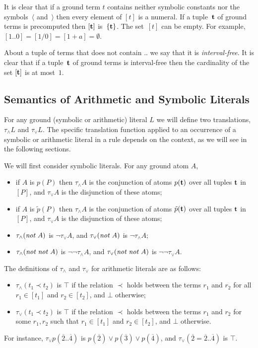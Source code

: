 \documentclass{tlp}
\def\no{{\it not}}
\begin{document}
It is clear that if a ground term $t$ contains neither symbolic
constants nor the symbols~$\langle$ and~$\rangle$ then every element of $[t]$
is a numeral.
If a tuple~${\bf t}$ of ground terms is
precomputed then $[{\bf t}]$ is~$\{{\bf t}\}$.
The set~$[t]$ can be empty. For example,
$[1..0] = [1/0] = [1+a] = \emptyset$.

About a tuple of terms that does not contain .. we say that it is
{\sl interval-free}.
It is clear that if a tuple~${\bf t}$ of
ground terms is interval-free then the cardinality of the set
$[{\bf t}]$ is at most~$1$.

\subsection{Semantics of Arithmetic and Symbolic Literals}

For any ground (symbolic or arithmetic) literal $L$ we will define
two translations,
$\tau_{\land}L$ and $\tau_{\lor}L$. The
specific translation function applied to an occurrence of a symbolic or
arithmetic literal in a rule
depends on the context, as we will see in the following sections.

We will first consider symbolic literals.
For any ground atom $A$,
\begin{itemize}
\item
if $A$ is $p(P)$ then $\tau_{\land}A$ is the conjunction of
atoms $p({\bf t})$ over all tuples $\bf t$ in~$[P]$,
and $\tau_{\lor}A$ is the disjunction of these atoms;
\item
if $A$ is $\tilde{p}(P)$ then $\tau_{\land}A$ is the conjunction of
atoms $\tilde{p}({\bf t})$ over all tuples $\bf t$ in~$[P]$,
and $\tau_{\lor}A$ is the disjunction of these atoms;
\item $\tau_{\land} (\no \; A)$ is $\neg \tau_{\lor} A$, and
 $\tau_{\lor} (\no \; A)$ is $\neg \tau_{\land} A$;
\item $\tau_{\land} (\no \; \no \; A)$ is
$\neg\neg \tau_{\land} A$, and
$\tau_{\lor} (\no \; \no \; A)$ is
$\neg\neg \tau_{\lor} A$.
\end{itemize}
The definitions of  $\tau_{\land}$ and $\tau_{\lor}$ for arithmetic literals
 are as follows:
\begin{itemize}
\item $\tau_{\land} (t_1 \prec t_2)$ is
$\top$ if the relation $\prec$ holds between
the terms $r_1$ and $r_2$ for all $r_1 \in
[t_1]$ and $r_2 \in [t_2]$, and $\bot$
otherwise;
\item $\tau_{\lor} (t_1 \prec t_2)$ is
$\top$ if the relation $\prec$ holds between the terms
$r_1$ and $r_2$ for some $r_1, r_2$
such that $r_1 \in [t_1]$ and $r_2 \in [t_2]$, and $\bot$ otherwise.
\end{itemize}
For instance, $\tau_{\lor}p(\overline 2..\overline 4)$ is
$p(\overline 2) \lor p(\overline 3) \lor p(\overline 4)$,
and $\tau_{\lor}(\overline 2=\overline 2..\overline 4)$ is $\top$.
\end{document}
